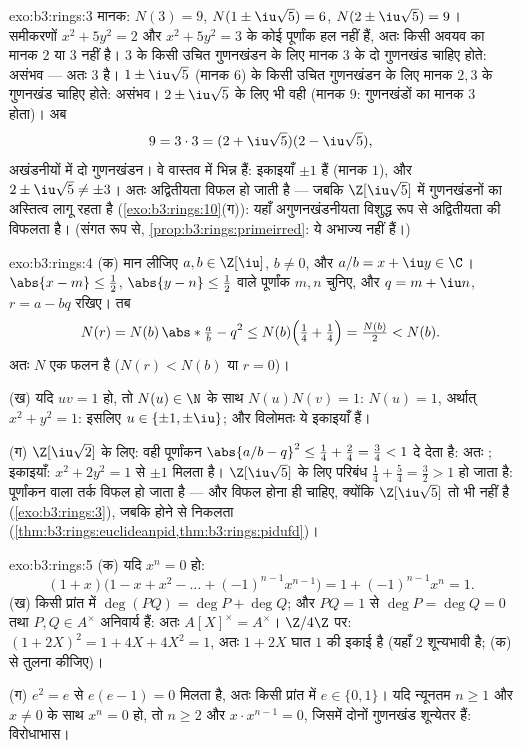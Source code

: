 \begin{solution}{exo:b3:rings:3}
मानक: $N(3) = 9$, $N(1 \pm \iu\sqrt5) = 6$, $N(2 \pm \iu\sqrt5) =
9$। समीकरणों $x^2 + 5y^2 = 2$ और $x^2 + 5y^2 = 3$ के कोई पूर्णांक हल
नहीं हैं, अतः किसी अवयव का मानक $2$ या $3$ नहीं है। $3$ के किसी
उचित गुणनखंडन के लिए मानक $3$ के दो गुणनखंड चाहिए होते: असंभव ---
अतः $3$  है। $1
\pm \iu\sqrt5$ (मानक $6$) के किसी उचित गुणनखंडन के लिए
मानक $2, 3$ के गुणनखंड चाहिए होते: असंभव। $2 \pm \iu\sqrt5$ के लिए भी वही (मानक
$9$: गुणनखंडों का मानक $3$ होता)। अब
\[
9 = 3 \cdot 3 = (2 + \iu\sqrt5)(2 - \iu\sqrt5),
\]
अखंडनीयों में दो गुणनखंडन। वे वास्तव में भिन्न हैं: इकाइयाँ $\pm 1$
हैं (मानक $1$), और $2 \pm \iu\sqrt5
\neq \pm 3$। अतः अद्वितीयता विफल हो जाती है --- जबकि
$\Z[\iu\sqrt5]$ में गुणनखंडनों का अस्तित्व लागू रहता है (\cref{exo:b3:rings:10}(ग)): यहाँ
अगुणनखंडनीयता विशुद्ध रूप से अद्वितीयता की विफलता है। (संगत रूप से,
\cref{prop:b3:rings:primeirred}: ये  अभाज्य नहीं हैं।)
\end{solution}

\begin{solution}{exo:b3:rings:4}
(क) मान लीजिए $a, b \in \Z[\iu]$, $b \neq 0$, और $a/b = x + \iu y \in
\C$। $\abs{x - m} \leq \frac12$, $\abs{y - n} \leq \frac12$ वाले पूर्णांक $m, n$
चुनिए, और $q = m + \iu n$, $r = a - bq$ रखिए। तब
\[
N(r) = N(b)\,\abs*{\tfrac ab - q}^2
\leq N(b)\Bigl(\tfrac14 + \tfrac14\Bigr) = \tfrac{N(b)}2 < N(b).
\]
अतः $N$ एक  फलन है ($N(r) < N(b)$ या $r = 0$)।

(ख) यदि $uv = 1$ हो, तो $N(u) \in \N$ के साथ $N(u)N(v) = 1$: $N(u) =
1$, अर्थात् $x^2 + y^2 = 1$:
इसलिए $u \in \{\pm 1, \pm\iu\}$; और विलोमतः ये इकाइयाँ हैं।

(ग) $\Z[\iu\sqrt2]$ के लिए: वही पूर्णांकन $\abs{a/b - q}^2
\leq \frac14 + \frac{2}4 = \frac34 < 1$ दे देता है: अतः ;
इकाइयाँ: $x^2 +
2y^2 = 1$ से $\pm 1$ मिलता है। $\Z[\iu\sqrt5]$ के लिए परिबंध $\frac14 + \frac54 = \frac32 > 1$ हो जाता
है: पूर्णांकन वाला तर्क विफल हो जाता है --- और विफल होना ही चाहिए,
क्योंकि $\Z[\iu\sqrt5]$ तो  भी नहीं है (\cref{exo:b3:rings:3}), जबकि  होने से 
निकलता (\cref{thm:b3:rings:euclideanpid,thm:b3:rings:pidufd})।
\end{solution}

\begin{solution}{exo:b3:rings:5}
(क) यदि $x^n = 0$ हो:
\[
(1 + x)\bigl(1 - x + x^2 - \dots + (-1)^{n-1}x^{n-1}\bigr)
= 1 + (-1)^{n-1}x^n = 1 .
\]
(ख) किसी प्रांत में $\deg(PQ) = \deg P + \deg Q$; और $PQ = 1$ से $\deg P = \deg Q = 0$ तथा $P, Q \in A^\times$ अनिवार्य हैं:
अतः $A[X]^\times =
A^\times$। $\Z/4\Z$ पर: $(1 + 2X)^2 = 1 + 4X + 4X^2 = 1$, अतः $1
+ 2X$ घात $1$ की इकाई है (यहाँ
$2$ शून्यभावी है; (क) से तुलना कीजिए)।

(ग) $e^2 = e$ से $e(e - 1) = 0$ मिलता है, अतः किसी प्रांत में $e \in \{0, 1\}$। यदि न्यूनतम
$n \geq 1$ और $x \ne 0$ के साथ $x^n = 0$ हो, तो $n \geq 2$ और $x \cdot x^{n-1} = 0$, जिसमें दोनों
गुणनखंड शून्येतर हैं: विरोधाभास।
\end{solution}

